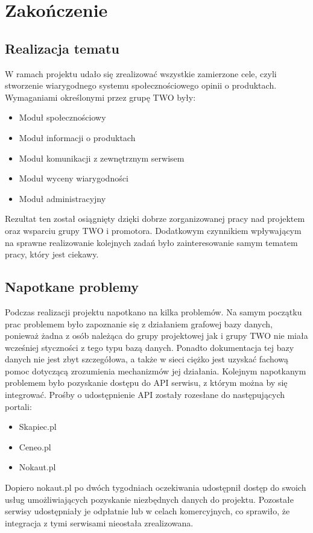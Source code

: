 \chapter{Zakończenie}

\section{Realizacja tematu}

W ramach projektu udało się zrealizować wszystkie zamierzone cele, czyli stworzenie wiarygodnego systemu społecznościowego opinii o produktach. Wymaganiami określonymi przez grupę TWO były:
\begin{itemize}
\item Moduł społecznościowy
\item Moduł informacji o produktach
\item Moduł komunikacji z zewnętrznym serwisem
\item Moduł wyceny wiarygodności
\item Moduł administracyjny
\end{itemize}
Rezultat ten został osiągnięty dzięki dobrze zorganizowanej pracy nad projektem oraz wsparciu grupy TWO i promotora. Dodatkowym czynnikiem wpływającym na sprawne realizowanie kolejnych zadań było zainteresowanie samym tematem pracy, który jest ciekawy.

\section{Napotkane problemy}

Podczas realizacji projektu napotkano na kilka problemów. Na samym początku prac problemem było zapoznanie się z działaniem grafowej bazy danych, ponieważ żadna z osób należąca do grupy projektowej jak i grupy TWO nie miała wcześniej styczności z tego typu bazą danych. Ponadto dokumentacja tej bazy danych nie jest zbyt szczegółowa, a także w sieci ciężko jest uzyskać fachową pomoc dotyczącą zrozumienia mechanizmów jej działania.
Kolejnym napotkanym problemem było pozyskanie dostępu do API serwisu, z którym można by się integrować. Prośby o udostępnienie API zostały rozesłane do następujących portali:
\begin{itemize}
\item Skapiec.pl
\item Ceneo.pl
\item Nokaut.pl
\end{itemize}
Dopiero nokaut.pl po dwóch tygodniach oczekiwania udostępnił dostęp do swoich usług umożliwiających pozyskanie niezbędnych danych do projektu. Pozostałe serwisy udostępniały je odpłatnie lub w celach komercyjnych, co sprawiło, że integracja z tymi serwisami nieostała zrealizowana.

